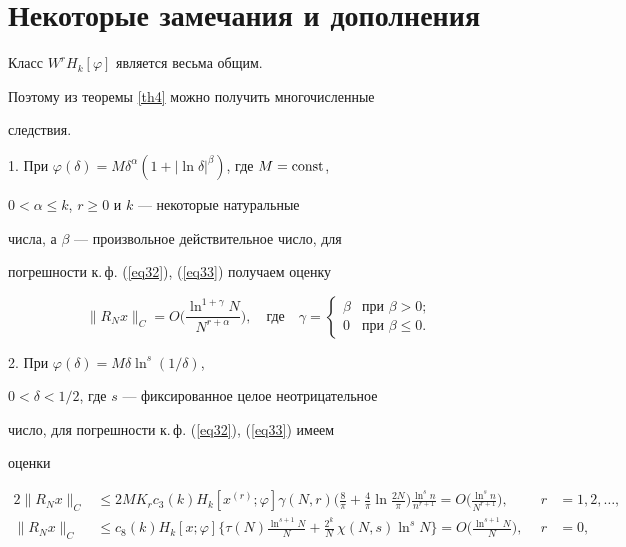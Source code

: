 \section{Некоторые замечания и дополнения}








Класс $W^rH_k[\varphi]$ является весьма общим.


Поэтому из теоремы \ref{th4} можно получить многочисленные


следствия.





1. При $\varphi(\delta)= M\delta^\alpha


(1+|\ln\delta|^\beta)$, где $M=\const$,


$0<\alpha\leq k$, $r\geq0$ и $k$ --- некоторые натуральные


числа, а $\beta$ --- произвольное действительное число, для


погрешности к.\,ф. (\ref{eq32}), (\ref{eq33}) получаем оценку


$$


\|R_Nx\|_C =


O\bigg(\frac{\ln^{1+\gamma}N}{N^{r+\alpha}}\bigg),


\quad\text{где}\quad\gamma =\begin{cases}\beta &


\text{при } \beta>0;\\ 0 & \text{при } \beta\leq0.


\end{cases}


$$





2. При $\varphi(\delta)=M\delta\ln^s(1/\delta)$,


$0<\delta<1/2$, где $s$ --- фиксированное целое неотрицательное


число, для погрешности к.\,ф. (\ref{eq32}), (\ref{eq33}) имеем


оценки


\begin{alignat}{2}\label{eq42}


\|R_Nx\|_C&\leq2MK_rc_3(k)H_k


[x^{(r)};\varphi] \gamma(N,r)


\bigg(\frac{8}{\pi} + \frac{4}{\pi}\ln\frac{2N}{\pi}\bigg)


\frac{\ln^sn}{n^{r+1}} = O\bigg(\frac{\ln^sn}{N^{r+1}}\bigg), &\ \ 


r&=1,2,\dotsc, \\


%


\label{eq43}


\|R_Nx\|_C&\leq c_{8}(k)H_k[x;\varphi]


\bigg\{\tau(N)\frac{\ln^{s+1}N}{N} +


\frac{2^k}{N}\,\chi(N,s)\ln^sN\bigg\} =


O\bigg(\frac{\ln^{s+1}N}{N}\bigg), & \ \ r&=0,


\end{alignat}


